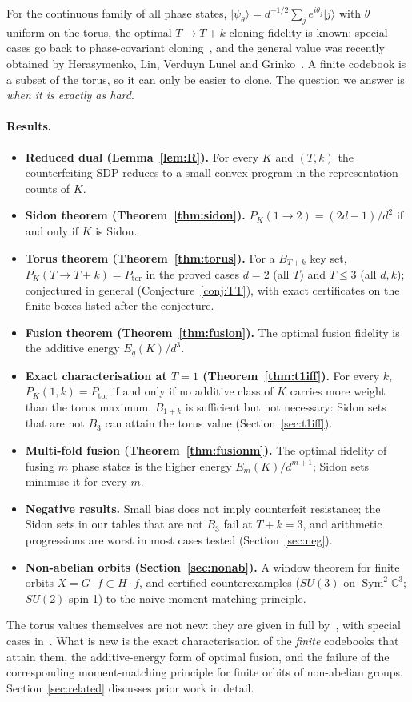 \documentclass[11pt]{article}
\newcommand{\C}{\mathbb{C}}
\newcommand{\Sym}{\operatorname{Sym}}
\newcommand{\Ptor}{P_{\mathrm{tor}}}
\newcommand{\ket}[1]{\lvert #1\rangle}
\theoremstyle{definition}
\theoremstyle{remark}
\begin{document}
For the continuous family of all phase states, $\ket{\psi_\theta}=d^{-1/2}\sum_j e^{i\theta_j}\ket{j}$ with
$\theta$ uniform on the torus, the optimal $T\to T+k$ cloning fidelity is known: special cases go back to
phase-covariant cloning~\cite{Buscemi2005,KimChitambar2022}, and the general value was recently obtained by
Herasymenko, Lin, Verduyn Lunel and Grinko~\cite{Herasymenko2026}. A finite codebook is a subset of the torus, so it can
only be easier to clone. The question we answer is \emph{when it is exactly as hard}.

\paragraph{Results.}
\begin{itemize}
\item \textbf{Reduced dual (Lemma~\ref{lem:R}).} For every $K$ and $(T,k)$ the counterfeiting SDP reduces to a
small convex program in the representation counts of $K$.
\item \textbf{Sidon theorem (Theorem~\ref{thm:sidon}).} $P_K(1\to2)=(2d-1)/d^2$ if and only if $K$ is Sidon.
\item \textbf{Torus theorem (Theorem~\ref{thm:torus}).} For a $B_{T+k}$ key set, $P_K(T\to T+k)=\Ptor$ in the proved cases
$d=2$ (all $T$) and $T\le3$ (all $d,k$); conjectured in general (Conjecture~\ref{conj:TT}), with exact certificates on the
finite boxes listed after the conjecture.
\item \textbf{Fusion theorem (Theorem~\ref{thm:fusion}).} The optimal fusion fidelity is the additive energy $E_q(K)/d^3$.
\item \textbf{Exact characterisation at $T=1$ (Theorem~\ref{thm:t1iff}).} For every $k$, $P_K(1,k)=\Ptor$ if and only if no additive class
of $K$ carries more weight than the torus maximum. $B_{1+k}$ is sufficient but not necessary: Sidon sets that are not $B_3$ can attain the torus
value (Section~\ref{sec:t1iff}).
\item \textbf{Multi-fold fusion (Theorem~\ref{thm:fusionm}).} The optimal fidelity of fusing $m$ phase states is the higher energy $E_m(K)/d^{m+1}$;
Sidon sets minimise it for every $m$.
\item \textbf{Negative results.} Small bias does not imply counterfeit resistance; the Sidon sets in our tables that are not $B_3$ fail at $T+k=3$,
and arithmetic progressions are worst in most cases tested (Section~\ref{sec:neg}).
\item \textbf{Non-abelian orbits (Section~\ref{sec:nonab}).} A window theorem for finite orbits $X=G\cdot f\subset H\cdot f$,
and certified counterexamples ($SU(3)$ on $\Sym^2\C^3$; $SU(2)$ spin 1) to the naive moment-matching principle.
\end{itemize}
The torus values themselves are not new: they are given in full by~\cite{Herasymenko2026}, with special cases
in~\cite{Buscemi2005,KimChitambar2022}. What is new is the exact characterisation of the \emph{finite} codebooks that attain them, the
additive-energy form of optimal fusion, and the failure of the corresponding moment-matching principle for finite orbits of
non-abelian groups. Section~\ref{sec:related} discusses prior work in detail.
\end{document}
